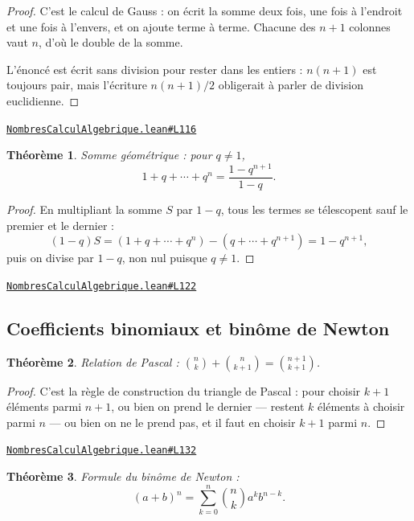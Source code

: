 \documentclass[11pt,a4paper]{article}
\theoremstyle{definition}
\theoremstyle{plain}
\newtheorem{theoreme}{Théorème}
\newcommand{\source}[2]{\par\smallskip\noindent\hfill{\footnotesize\href{#1}{\texttt{#2}}}\par\smallskip}
\begin{document}
\begin{proof}
C'est le calcul de Gauss : on écrit la somme deux fois, une fois à l'endroit et une fois
à l'envers, et on ajoute terme à terme. Chacune des $n+1$ colonnes vaut $n$, d'où le
double de la somme.

L'énoncé est écrit sans division pour rester dans les entiers : $n(n+1)$ est toujours
pair, mais l'écriture $n(n+1)/2$ obligerait à parler de division euclidienne.
\end{proof}
\source{https://github.com/Commutator-IO/learn-lean/blob/main/courses/02-lycee/01-nombres-calcul-algebrique/NombresCalculAlgebrique.lean\#L116}{NombresCalculAlgebrique.lean\#L116}

\begin{theoreme}
Somme géométrique : pour $q \ne 1$,
\[ 1 + q + \cdots + q^n = \frac{1 - q^{n+1}}{1 - q} . \]
\end{theoreme}

\begin{proof}
En multipliant la somme $S$ par $1 - q$, tous les termes se télescopent sauf le premier
et le dernier :
\[ (1-q)S = (1 + q + \cdots + q^n) - (q + \cdots + q^{n+1}) = 1 - q^{n+1} , \]
puis on divise par $1 - q$, non nul puisque $q \ne 1$.
\end{proof}
\source{https://github.com/Commutator-IO/learn-lean/blob/main/courses/02-lycee/01-nombres-calcul-algebrique/NombresCalculAlgebrique.lean\#L122}{NombresCalculAlgebrique.lean\#L122}

\subsection{Coefficients binomiaux et binôme de Newton}

\begin{theoreme}
Relation de Pascal : $\binom{n}{k} + \binom{n}{k+1} = \binom{n+1}{k+1}$.
\end{theoreme}

\begin{proof}
C'est la règle de construction du triangle de Pascal : pour choisir $k+1$ éléments parmi
$n+1$, ou bien on prend le dernier — restent $k$ éléments à choisir parmi $n$ — ou bien on
ne le prend pas, et il faut en choisir $k+1$ parmi $n$.
\end{proof}
\source{https://github.com/Commutator-IO/learn-lean/blob/main/courses/02-lycee/01-nombres-calcul-algebrique/NombresCalculAlgebrique.lean\#L132}{NombresCalculAlgebrique.lean\#L132}

\begin{theoreme}
Formule du binôme de Newton :
\[ (a+b)^n = \sum_{k=0}^{n} \binom{n}{k} a^k b^{n-k} . \]
\end{theoreme}
\end{document}
